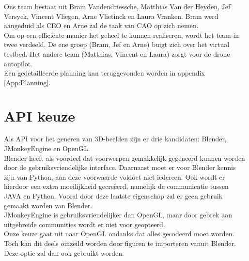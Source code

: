 \documentclass{peno-opdracht1}
\begin{document}
\maketitle

\noindent
	Ons team bestaat uit Bram Vandendriessche, Matthias Van der Heyden, Jef Versyck, Vincent Vliegen, Arne Vlietinck en Laura Vranken. Bram werd aangeduid als CEO en Arne zal de taak van CAO op zich nemen. \\
	Om op een effici\"ente manier het geheel te kunnen realiseren, wordt het team in twee verdeeld. De ene groep (Bram, Jef en Arne) buigt zich over het virtual testbed. Het andere team  (Matthias, Vincent en Laura) zorgt voor de drone autopilot.\\
	Een gedetailleerde planning kan teruggevonden worden in appendix \ref{App:Planning}.

\section{API keuze}
Als API voor het generen van 3D-beelden zijn er drie kandidaten: Blender, JMonkeyEngine en OpenGL.\\
Blender heeft als voordeel dat voorwerpen gemakkelijk gegeneerd kunnen worden door de gebruiksvriendelijke interface. Daarnaast moet er voor Blender kennis zijn van Python, aan deze voorwaarde voldoet niet iedereen. Ook wordt er hierdoor een extra moeilijkheid gecre\"eerd, namelijk de \mbox{communicatie} tussen JAVA en Python. Vooral door deze laatste eigenschap zal er geen gebruik gemaakt worden van Blender. \\
JMonkeyEngine is gebruiksvriendelijker dan OpenGL, maar door gebrek aan uitgebreide communities wordt er niet voor geopteerd.\\
Onze keuze gaat uit naar OpenGL ondanks dat alles gecodeerd moet worden. Toch kan dit deels omzeild worden door figuren te importeren vanuit Blender. Deze optie zal dan ook gebruikt worden. 
\end{document}
